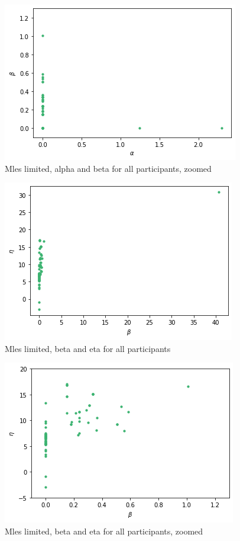 \begin{figure}
    \centering
    \includegraphics[scale=0.7]{pictures/plotted_mles_limited_alpha_beta_zoomed_gk1.png}
    \caption{Mles limited, alpha and beta for all participants, zoomed}
    \label{fig:mles_limited_alpha_beta_zoomed}
\end{figure}

\begin{figure}
    \centering
    \includegraphics[scale=0.7]{pictures/plotted_mles_limited_beta_eta_gk1.png}
    \caption{Mles limited, beta and eta for all participants}
    \label{fig:mles_limited_beta_eta}
\end{figure}

\begin{figure}
    \centering
    \includegraphics[scale=0.7]{pictures/plotted_mles_limited_beta_eta_zoomed_gk1.png}
    \caption{Mles limited, beta and eta for all participants, zoomed}
    \label{fig:mles_limited_beta_eta_zoomed}
\end{figure}


